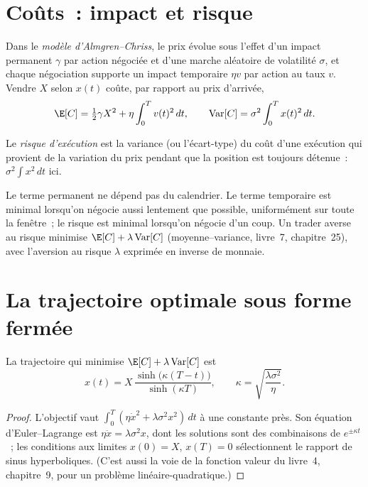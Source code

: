 \section{Coûts~: impact et risque}

\begin{definition}\label{def:mx:the-almgren-chriss-framework:ac}
Dans le \emph{modèle d'Almgren--Chriss}, le prix évolue sous l'effet d'un impact permanent $\gamma$ par action négociée et d'une marche aléatoire de
volatilité $\sigma$, et chaque négociation supporte un impact temporaire $\eta v$ par action au taux $v$. Vendre $X$ selon $x(t)$ coûte, par rapport au prix d'arrivée,
\[
\E[C]=\tfrac12\gamma X^2+\eta\int_0^Tv(t)^2\,dt,\qquad \operatorname{Var}[C]=\sigma^2\int_0^Tx(t)^2\,dt.
\]
\end{definition}

\begin{definition}\label{def:mx:the-almgren-chriss-framework:risk}
Le \emph{risque d'exécution} est la variance (ou l'écart-type) du coût d'une exécution qui provient de la variation du prix pendant que la
position est toujours détenue~: $\sigma^2\int x^2\,dt$ ici.
\end{definition}

Le terme permanent ne dépend pas du calendrier. Le terme temporaire est minimal lorsqu'on négocie aussi lentement que possible, uniformément sur toute la fenêtre~; le
risque est minimal lorsqu'on négocie d'un coup. Un trader averse au risque minimise $\E[C]+\lambda\operatorname{Var}[C]$ (moyenne--variance, livre~7, chapitre~25),
avec l'aversion au risque $\lambda$ exprimée en inverse de monnaie.

\section{La trajectoire optimale sous forme fermée}

\begin{proposition}\label{prop:mx:the-almgren-chriss-framework:sinh}
La trajectoire qui minimise $\E[C]+\lambda\operatorname{Var}[C]$ est
\[
x(t)=X\,\frac{\sinh\bigl(\kappa(T-t)\bigr)}{\sinh(\kappa T)},\qquad \kappa=\sqrt{\frac{\lambda\sigma^2}{\eta}}.
\]
\end{proposition}

\begin{proof}
L'objectif vaut $\int_0^T(\eta\dot x^2+\lambda\sigma^2x^2)\,dt$ à une constante près. Son équation d'Euler--Lagrange est $\eta\ddot x=\lambda\sigma^2x$, dont
les solutions sont des combinaisons de $e^{\pm\kappa t}$~; les conditions aux limites $x(0)=X$, $x(T)=0$ sélectionnent le rapport de sinus hyperboliques. (C'est aussi la voie de la fonction valeur
du livre~4, chapitre~9, pour un problème linéaire-quadratique.)
\end{proof}

